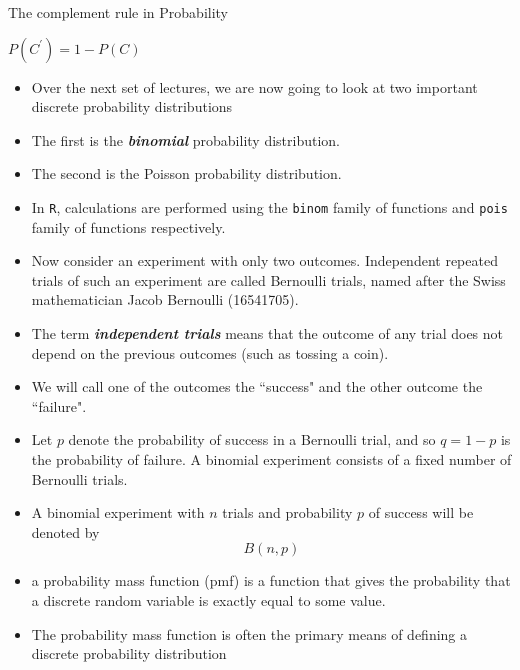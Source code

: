 \documentclass[12pt]{report}
\begin{document}


The complement rule in Probability

$P(C^{\prime}) = 1- P(C)$


{ \Large
	
	\begin{itemize}
		
		\item Over the next set of lectures, we are now going to look at two important discrete probability distributions
		
		\item The first is the \textbf{\emph{binomial}} probability distribution.
		
		\item The second is the Poisson probability distribution.
		
		\item In \texttt{R}, calculations are performed using the \texttt{binom} family of functions and \texttt{pois} family of functions respectively.
		
		\item Now consider an experiment with only two outcomes. Independent repeated trials of such an experiment are
		called Bernoulli trials, named after the Swiss mathematician Jacob Bernoulli (16541705). \item The term \textbf{\emph{independent
				trials}} means that the outcome of any trial does not depend on the previous outcomes (such as tossing a coin).
		\item We will call one of the outcomes the ``success" and the other outcome the ``failure".
		
		\item
		Let $p$ denote the probability of success in a Bernoulli trial, and so $q = 1 - p$ is the probability of failure.
		A binomial experiment consists of a fixed number of Bernoulli trials. \item A binomial experiment with $n$ trials and
		probability $p$ of success will be denoted by
		\[B(n, p)\]
		\item a probability mass function (pmf) is a function that gives the probability that a 
		discrete random variable is exactly equal to some value. 
		\item The probability mass function is often the primary means of defining a discrete probability distribution 
	\end{itemize}
}
\end{document}
